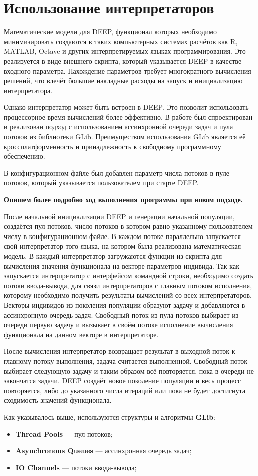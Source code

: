 \section*{Использование интерпретаторов}

Математические модели для DEEP,
функционал которых необходимо минимизировать
создаются в таких компьютерных системах расчётов
как R, MATLAB, Octave
и других интерпретируемых языках программирования.
Это реализуется в виде внешнего скрипта,
который указывается DEEP в качестве входного параметра.
Нахождение параметров требует
многократного вычисления решений,
что влечёт большие накладные расходы
на запуск и инициализацию интерпретатора.

Однако интерпретатор может быть встроен в DEEP.
Это позволит использовать процессорное время вычислений
более эффективно.
В работе был спроектирован и реализован
подход с использованием
ассинхронной очереди задач и пула потоков
из библиотеки GLib.
Преимуществом использования GLib
является её кроссплатформенность
и принадлежность к свободному программному обеспечению.

В конфигурационном файле был добавлен
параметр числа потоков в пуле потоков,
который указывается пользователем
при старте DEEP.

\textbf{Опишем более подробно ход выполнения программы
при новом подходе.}

После начальной инициализации DEEP
и генерации начальной популяции,
создаётся пул потоков,
число потоков в котором равно
указанному пользователем числу в
конфигурационном файле.
В каждом потоке параллельно
запускается свой интерпретатор того языка,
на котором была реализована математическая модель.
В каждый интерпретатор загружаются
функции из скрипта
для вычисления значения функционала
на векторе параметров индивида.
Так как запускается интерпретатор
с интерфейсом командной строки,
необходимо создать потоки ввода-вывода,
для связи интерпретаторов
с главным потоком исполнения,
которому необходимо получить
результаты вычислений со всех интерпретаторов.
Векторы индивидов из поколения популяции
образуют задачу и
добавляются в ассинхронную очередь задач.
Свободный поток из пула потоков
выбирает из очереди первую задачу
и вызывает в своём потоке
исполнение вычисления функционала
на данном векторе в интерпретаторе.

После вычисления интерпретатор
возвращает результат в
выходной поток к главному потоку выполнения,
задача считается выполненной.
Свободный поток выбирает следующую задачу
и таким образом всё повторяется,
пока в очереди не закончатся задачи.
DEEP создаёт новое поколение популяции
и весь процесс повторяется,
либо до указанного числа итераций или
пока не будет достигнута сходимость
значений функционала.

Как указывалось выше,
используются структуры и алгоритмы
\textbf{GLib}\cite{GLib}:

\begin{itemize}
    \item \textbf{Thread Pools} --- пул потоков;
    \item \textbf{Asynchronous Queues} --- ассинхронная очередь задач;
    \item \textbf{IO Channels} --- потоки ввода-вывода;
\end{itemize}

